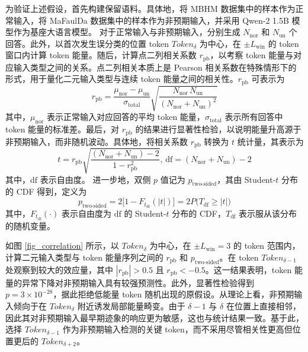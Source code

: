 为验证上述假设，首先构建保留语料。具体地，将 MBHM 数据集中的样本作为正常输入，将 MaFaulDa 数据集中的样本作为非预期输入，并采用 Qwen-2 1.5B 模型作为基座大语言模型。
对于正常输入与非预期输入，分别生成 $N_\mathrm{nor}$ 和 $N_\mathrm{un}$ 个回答。此外，以首次发生误分类的位置 token $\mathit{Token}_{{\delta}}$ 为中心，在 $\pm L_{\mathrm{win}}$ 的 token 窗口内计算 token 能量。随后，计算点二列相关系数 $r_\mathrm{pb}$，以考察 token 能量与对应输入类型之间的关系。点二列相关本质上是 Pearson 相关系数在特殊情形下的形式，用于量化二元输入类型与连续 token 能量之间的相关性。$r_\mathrm{pb}$ 可表示为
\begin{equation}
	r_\mathrm{{pb}}=
	\frac{\mu_\mathrm{nor} - \mu_\mathrm{un}}{\sigma_\mathrm{total}}
	\sqrt{\frac{N_\mathrm{nor}\,N_\mathrm{un}}{(N_\mathrm{nor}+N_\mathrm{un})^2}}
\end{equation}
% 
其中，$\mu_\mathrm{nor}$ 表示正常输入对应回答的平均 token 能量，$\sigma_\mathrm{total}$ 表示所有回答中 token 能量的标准差。最后，对 $r_\mathrm{pb}$ 的结果进行显著性检验，以说明能量升高源于非预期输入，而非随机波动。具体地，将相关系数 $r_\mathrm{pb}$ 转换为 $t$ 统计量，其表示为
\begin{equation}
	t=r_\mathrm{pb}\sqrt{\frac{(N_\mathrm{nor}+N_\mathrm{un}) - 2}{1 - r_\mathrm{pb}^2}},\,\mathrm{df} = (N_\mathrm{nor}+N_\mathrm{un}) - 2
\end{equation}
其中，$\mathrm{df}$ 表示自由度。
进一步地，双侧 $p$ 值记为 $p_{\text{two-sided}}$，其由 Student-$t$ 分布的 CDF 得到，定义为
\begin{equation}
	p_{\text{two-sided}} = 2\bigl[1-F_{t_{\mathrm{df}}}(|t|)\bigr]
	= 2P\bigl(T_{\mathrm{df}}\ge |t|\bigr)
	\label{eq:p_value}
\end{equation}
% 
其中，$F_{t_{\mathrm{df}}}(\cdot)$ 表示自由度为 $\mathrm{df}$ 的 Student-$t$ 分布的 CDF，$T_{\mathrm{df}}$ 表示服从该分布的随机变量。

如图 \ref{fig_correlation} 所示，以 $\mathit{Token}_{\delta}$ 为中心，在 $\pm L_{\mathrm{win}}=3$ 的 token 范围内，计算二元输入类型与 token 能量序列之间的 $r_{\mathrm{pb}}$ 和 $p_{\text{two-sided}}$。在 token $\mathit{Token}_{\delta-1}$ 处观察到较大的效应量，其中 $|r_{\mathrm{pb}}| > 0.5$ 且 $r_{\mathrm{pb}} < -0.5$。这一结果表明，token 能量的异常下降对非预期输入具有较强预测性。此外，显著性检验得到 $p=3\times10^{-28}$，据此拒绝低能量 token 随机出现的原假设。从理论上看，非预期输入倾向于在 $\mathit{Token}_{\delta}$ 附近诱发局部能量畸变。由于 ${\delta}-1$ 与 ${\delta}$ 在位置上直接相邻，因此其对非预期输入最早期迹象的响应更为敏感，这也与统计结果一致。基于此，选择 $\mathit{Token}_{\delta-1}$ 作为非预期输入检测的关键 token，而不采用尽管相关性更高但位置更后的 $\mathit{Token}_{\delta+2}$。


